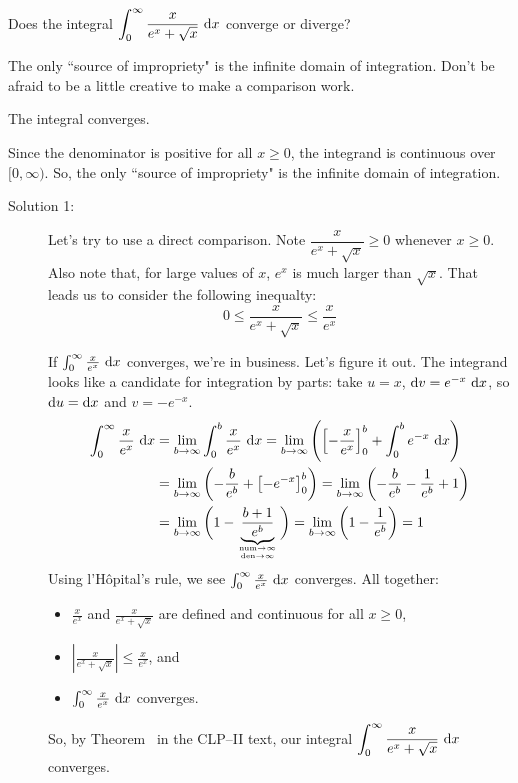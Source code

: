 \begin{Mquestion}
Does the integral $\displaystyle\int_0^\infty \frac{x}{e^x+\sqrt{x}} ~\mathrm{d}x$ converge or diverge?
\end{Mquestion}
\begin{hint}
The only ``source of impropriety" is the infinite domain of integration.
Don't be afraid to be a little creative to make a comparison work.
\end{hint}
\begin{answer}
The integral converges.
\end{answer}
\begin{solution}
Since the denominator is positive for all $x \geq 0$, the integrand is continuous over $[0, \infty)$. So, the only ``source of impropriety" is the infinite domain of integration.

\begin{description}
\item[Solution 1:] Let's try to use a direct comparison. Note $\dfrac{x}{e^x + \sqrt{x}} \geq 0$ whenever $x \geq 0$. Also note that, for large values of $x$, $e^x$ is much larger than $\sqrt{x}$. That leads us to consider the following inequalty:
\[
0\leq \dfrac{x}{e^x + \sqrt{x}}  \leq \dfrac{x}{e^x }\]

If $\int_0^\infty \frac{x}{e^x}~\mathrm{d}x$ converges, we're in business. Let's figure it out. The integrand looks like a candidate for integration by parts: take $u=x$, $\mathrm{d}v = e^{-x}~\mathrm{d}x$, so $\mathrm{d}u=\mathrm{d}x$ and $v=-e^{-x}$.
\begin{align*}
\int_0^\infty \frac{x}{e^x}~\dee{x}&=\lim_{b \to \infty}\int_0^b \frac{x}{e^x}~\dee{x}=
\lim_{b \to \infty}\left( \left[-\frac{x}{e^x}\right]_0^b + \int_0^b e^{-x}~\dee{x} \right)\\&=
\lim_{b \to \infty}\left(-\frac{b}{e^b} +\left[-e^{-x}\right]_0^b \right)=
\lim_{b \to \infty}\left(-\frac{b}{e^b} -\frac{1}{e^b}+1 \right)\\&=
\lim_{b \to \infty}\bigg(1-\underbrace{\frac{b+1}{e^b}}_{\atp{\mathrm{num}\to\infty}{\mathrm{den}\to\infty}}  \bigg)=\lim_{b \to \infty}\bigg(1-\frac{1}{e^b} \bigg)=1
\end{align*}
Using l'H\^{o}pital's rule, we see $\int_0^\infty \frac{x}{e^x}~\mathrm{d}x$ converges.  All together:
\begin{itemize}
\item $\frac{x}{e^x}$ and $\frac{x}{e^x+\sqrt{x}}$ are defined and continuous for all $x \geq 0$,
\item $\left|\frac{x}{e^x+\sqrt{x}}\right|\leq \frac{x}{e^x}$, and
\item $\int_0^\infty \frac{x}{e^x}~\mathrm{d}x$ converges.
\end{itemize}
So, by Theorem~ in the CLP--II text, our integral $\displaystyle\int_0^\infty \frac{x}{e^x+\sqrt{x}} ~\mathrm{d}x$ converges.


\end{description}
\end{solution}
